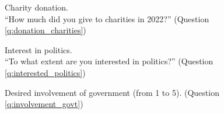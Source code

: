 \documentclass[12pt,english]{article}
\begin{document}
\begin{figure}[h!]
    \caption[Charity donation]{Charity donation. \\ ``How much did you give to charities in 2022?'' (Question \ref{q:donation_charities})}\label{fig:donation_charities}
\end{figure}

\begin{figure}[h!] 
    \caption[Interest in politics]{Interest in politics. \\ ``To what extent are you interested in politics?'' (Question \ref{q:interested_politics})}\label{fig:interested_politics}
\end{figure}

\begin{figure}[h!] 
    \caption[Desired involvement of government]{Desired involvement of government (from 1 to 5). (Question \ref{q:involvement_govt})}\label{fig:involvement_govt}
\end{figure}
\end{document}
